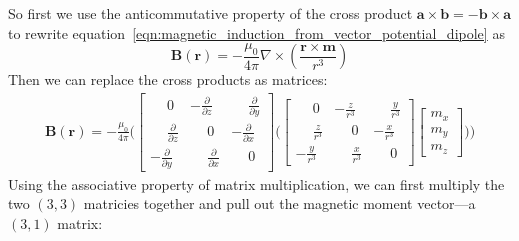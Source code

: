 \documentclass[12pt]{article}
\begin{document}
So first we use the anticommutative property of the cross product $\mathbf{a} \times \mathbf{b} = -\mathbf{b} \times \mathbf{a}$ to rewrite equation~\ref{eqn:magnetic_induction_from_vector_potential_dipole} as 
\begin{equation}
\label{eqn:magnetic_induction_from_vector_potential_anticommute}
\mathbf{B}(\mathbf{r}) = -\frac{\mu_0}{4\pi} \nabla \times \left( \frac{\mathbf{r}\times\mathbf{m}}{r^3} \right)
\end{equation}
Then we can replace the cross products as matrices:
\begin{align}
\label{eqn:magnetic_induction_matrices1}
\mathbf{B}(\mathbf{r}) = -\frac{\mu_0}{4\pi} \Bigg(
\begin{bmatrix}
\phantom{-}0                           &            -\frac{\partial}{\partial z} &  \phantom{-}\frac{\partial}{\partial y} \\ 
\phantom{-}\frac{\partial}{\partial z} &  \phantom{-}0                           &            -\frac{\partial}{\partial x} \\
          -\frac{\partial}{\partial y} &  \phantom{-}\frac{\partial}{\partial x} &  \phantom{-}0
\end{bmatrix}
\Bigg( 
\begin{bmatrix}
\phantom{-}0             &           -\frac{z}{r^3} & \phantom{-}\frac{y}{r^3} \\ 
\phantom{-}\frac{z}{r^3} & \phantom{-}0             &           -\frac{x}{r^3} \\
          -\frac{y}{r^3} & \phantom{-}\frac{x}{r^3} & \phantom{-}0
\end{bmatrix}
\begin{bmatrix}
m_x \\
m_y \\
m_z
\end{bmatrix}
\Bigg)
\Bigg)
\end{align}
Using the associative property of matrix multiplication, we can first multiply the two $(3, 3)$ matricies together and pull out the magnetic moment vector---a $(3, 1)$ matrix:
\end{document}
